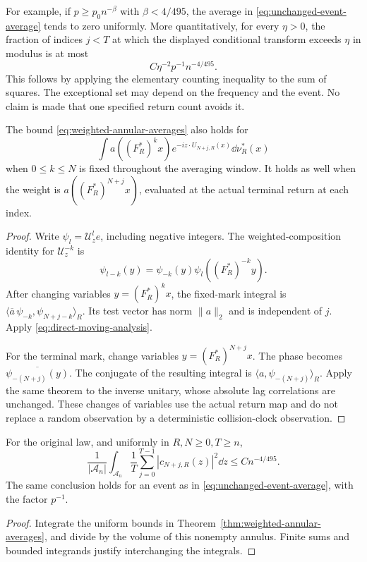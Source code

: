 For example, if $p\ge p_0 n^{-\beta}$ with $\beta<4/495$, the
average in \eqref{eq:unchanged-event-average} tends to zero uniformly.
More quantitatively, for every $\eta>0$, the fraction of indices
$j<T$ at which the displayed conditional transform exceeds $\eta$
in modulus is at most
\begin{equation}\label{eq:exceptional-return-fraction}
 C\eta^{-2}p^{-1}n^{-4/495}.
\end{equation}
This follows by applying the elementary counting inequality to the
sum of squares. The exceptional set may depend on the frequency and
the event. No claim is made that one specified return count avoids it.

\begin{corollary}
\label{cor:averaged-actual-marks}
The bound \eqref{eq:weighted-annular-averages} also holds for
\[
 \int a((F_R^*)^k x)e^{-iz\cdot U_{N+j,R}(x)}\dd\nu_R^*(x)
\]
when $0\le k\le N$ is fixed throughout the averaging window. It holds
as well when the weight is $a((F_R^*)^{N+j}x)$, evaluated at the actual
terminal return at each index.
\end{corollary}
\begin{proof}
Write $\psi_l=\mathcal U_z^l e$, including negative integers.
The weighted-composition identity for $\mathcal U_z^{-k}$ is
\[
 \psi_{l-k}(y)=\psi_{-k}(y)\psi_l((F_R^*)^{-k}y).
\]
After changing variables $y=(F_R^*)^kx$, the fixed-mark integral is
$\langle\overline a\,\psi_{-k},\psi_{N+j-k}\rangle_R$.
Its test vector has norm $\|a\|_2$ and is independent of $j$.
Apply \eqref{eq:direct-moving-analysis}.

For the terminal mark, change variables $y=(F_R^*)^{N+j}x$.
The phase becomes $\overline{\psi_{-(N+j)}(y)}$. The conjugate of
the resulting integral is $\langle a,\psi_{-(N+j)}\rangle_R$.
Apply the same theorem to the inverse unitary, whose absolute lag
correlations are unchanged. These changes of variables use the actual
return map and do not replace a random observation by a deterministic
collision-clock observation.
\end{proof}

\begin{corollary}
\label{cor:normalized-annular-integral}
For the original law, and uniformly in $R,N\ge0,T\ge n$,
\begin{equation}\label{eq:normalized-annular-integral}
 \frac1{|\mathcal A_n|}\int_{\mathcal A_n}
     \frac1T\sum_{j=0}^{T-1}|c_{N+j,R}(z)|^2\dd z
                                      \le Cn^{-4/495}.
\end{equation}
The same conclusion holds for an event as in
\eqref{eq:unchanged-event-average}, with the factor $p^{-1}$.
\end{corollary}
\begin{proof}
Integrate the uniform bounds in
Theorem~\ref{thm:weighted-annular-averages}, and divide by the volume
of this nonempty annulus. Finite sums and bounded integrands justify
interchanging the integrals.
\end{proof}

